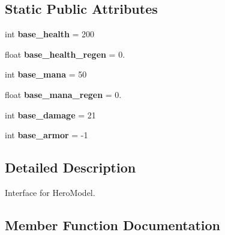 \subsection*{Static Public Attributes}
\begin{DoxyCompactItemize}
\item 
int {\bfseries base\+\_\+health} = 200\hypertarget{classatod_1_1heroes_1_1_hero_a63d4617587f4729c7a55203b006a0690}{}\label{classatod_1_1heroes_1_1_hero_a63d4617587f4729c7a55203b006a0690}

\item 
float {\bfseries base\+\_\+health\+\_\+regen} = 0.\hypertarget{classatod_1_1heroes_1_1_hero_a53c412a12d44420b4d01088e0c221ab1}{}\label{classatod_1_1heroes_1_1_hero_a53c412a12d44420b4d01088e0c221ab1}

\item 
int {\bfseries base\+\_\+mana} = 50\hypertarget{classatod_1_1heroes_1_1_hero_a62e40a1aeca72d4cf09703b70486b96f}{}\label{classatod_1_1heroes_1_1_hero_a62e40a1aeca72d4cf09703b70486b96f}

\item 
float {\bfseries base\+\_\+mana\+\_\+regen} = 0.\hypertarget{classatod_1_1heroes_1_1_hero_addf105e6717aa8562ef413bd23fa1b33}{}\label{classatod_1_1heroes_1_1_hero_addf105e6717aa8562ef413bd23fa1b33}

\item 
int {\bfseries base\+\_\+damage} = 21\hypertarget{classatod_1_1heroes_1_1_hero_a2ca0e9cedc05db0dda44c0d6738b2016}{}\label{classatod_1_1heroes_1_1_hero_a2ca0e9cedc05db0dda44c0d6738b2016}

\item 
int {\bfseries base\+\_\+armor} = -\/1\hypertarget{classatod_1_1heroes_1_1_hero_ae4828f969afb8590a8df38f54fc2dc2a}{}\label{classatod_1_1heroes_1_1_hero_ae4828f969afb8590a8df38f54fc2dc2a}

\end{DoxyCompactItemize}


\subsection{Detailed Description}
\begin{DoxyVerb}Interface for HeroModel. \end{DoxyVerb}
 

\subsection{Member Function Documentation}

